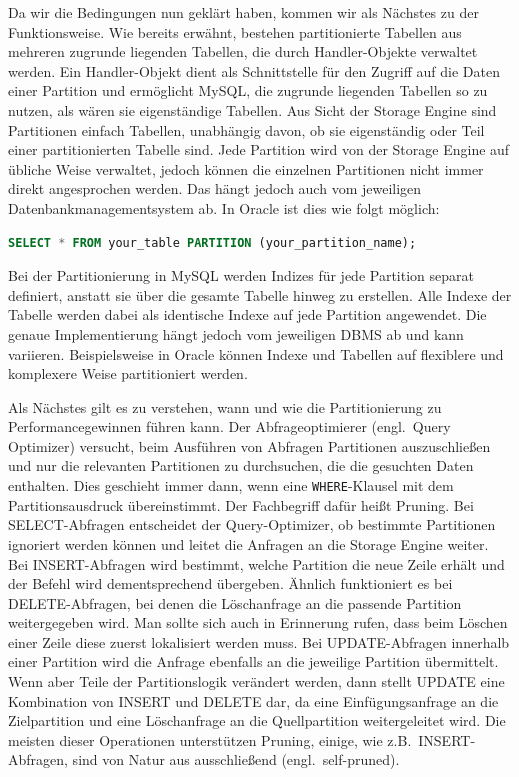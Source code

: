Da wir die Bedingungen nun geklärt haben, kommen wir als Nächstes zu der Funktionsweise.
Wie bereits erwähnt, bestehen partitionierte Tabellen aus mehreren zugrunde liegenden Tabellen, die durch Handler-Objekte verwaltet werden.
Ein Handler-Objekt dient als Schnittstelle für den Zugriff auf die Daten einer Partition und ermöglicht MySQL, die zugrunde liegenden Tabellen so zu nutzen, als wären sie eigenständige Tabellen.
Aus Sicht der Storage Engine sind Partitionen einfach Tabellen, unabhängig davon, ob sie eigenständig oder Teil einer partitionierten Tabelle sind.
Jede Partition wird von der Storage Engine auf übliche Weise verwaltet, jedoch können die einzelnen Partitionen nicht immer direkt angesprochen werden.
Das hängt jedoch auch vom jeweiligen Datenbankmanagementsystem ab.
In Oracle ist dies wie folgt möglich:

\vspace{-5pt}
\begin{lstlisting}[language=SQL,label={lst:direct_partition}]
SELECT * FROM your_table PARTITION (your_partition_name);
\end{lstlisting}
\vspace{-7pt}

Bei der Partitionierung in MySQL werden Indizes für jede Partition separat definiert, anstatt sie über die gesamte Tabelle hinweg zu erstellen.
Alle Indexe der Tabelle werden dabei als identische Indexe auf jede Partition angewendet.
Die genaue Implementierung hängt jedoch vom jeweiligen DBMS ab und kann variieren.
Beispielsweise in Oracle können Indexe und Tabellen auf flexiblere und komplexere Weise partitioniert werden.

Als Nächstes gilt es zu verstehen, wann und wie die Partitionierung zu Performancegewinnen führen kann.
Der Abfrageoptimierer (engl.\ Query Optimizer) versucht, beim Ausführen von Abfragen Partitionen auszuschließen und nur die relevanten Partitionen zu durchsuchen, die die gesuchten Daten enthalten.
Dies geschieht immer dann, wenn eine \texttt{WHERE}-Klausel mit dem Partitionsausdruck übereinstimmt.
Der Fachbegriff dafür heißt Pruning.
Bei SELECT-Abfragen entscheidet der Query-Optimizer, ob bestimmte Partitionen ignoriert werden können und leitet die Anfragen an die Storage Engine weiter.
Bei INSERT-Abfragen wird bestimmt, welche Partition die neue Zeile erhält und der Befehl wird dementsprechend übergeben.
Ähnlich funktioniert es bei DELETE-Abfragen, bei denen die Löschanfrage an die passende Partition weitergegeben wird.
Man sollte sich auch in Erinnerung rufen, dass beim Löschen einer Zeile diese zuerst lokalisiert werden muss.
Bei UPDATE-Abfragen innerhalb einer Partition wird die Anfrage ebenfalls an die jeweilige Partition übermittelt.
Wenn aber Teile der Partitionslogik verändert werden, dann stellt UPDATE eine Kombination von INSERT und DELETE dar, da eine Einfügungsanfrage an die Zielpartition und eine Löschanfrage an die Quellpartition weitergeleitet wird.
Die meisten dieser Operationen unterstützen Pruning, einige, wie z.B.\ INSERT-Abfragen, sind von Natur aus ausschließend (engl.\ self-pruned).

